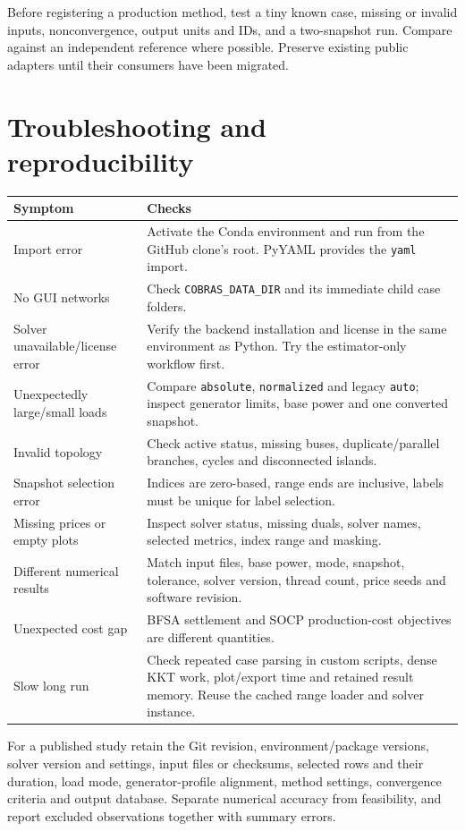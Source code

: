 \documentclass[11pt,a4paper]{article}
\newcommand{\code}[1]{\nolinkurl{#1}}
\begin{document}
Before registering a production method, test a tiny known case, missing or
invalid inputs, nonconvergence, output units and IDs, and a two-snapshot run.
Compare against an independent reference where possible. Preserve existing
public adapters until their consumers have been migrated.

\section{Troubleshooting and reproducibility}
\begin{longtable}{p{.32\linewidth}p{.60\linewidth}}
\toprule Symptom & Checks \\\midrule\endhead
Import error & Activate the Conda environment and run from the GitHub clone's root. PyYAML provides the \code{yaml} import.\\
No GUI networks & Check \code{COBRAS_DATA_DIR} and its immediate child case folders.\\
Solver unavailable/license error & Verify the backend installation and license in the same environment as Python. Try the estimator-only workflow first.\\
Unexpectedly large/small loads & Compare \code{absolute}, \code{normalized} and legacy \code{auto}; inspect generator limits, base power and one converted snapshot.\\
Invalid topology & Check active status, missing buses, duplicate/parallel branches, cycles and disconnected islands.\\
Snapshot selection error & Indices are zero-based, range ends are inclusive, labels must be unique for label selection.\\
Missing prices or empty plots & Inspect solver status, missing duals, solver names, selected metrics, index range and masking.\\
Different numerical results & Match input files, base power, mode, snapshot, tolerance, solver version, thread count, price seeds and software revision.\\
Unexpected cost gap & BFSA settlement and SOCP production-cost objectives are different quantities.\\
Slow long run & Check repeated case parsing in custom scripts, dense KKT work, plot/export time and retained result memory. Reuse the cached range loader and solver instance.\\
\bottomrule
\end{longtable}
For a published study retain the Git revision, environment/package versions,
solver version and settings, input files or checksums, selected rows and their
duration, load mode, generator-profile alignment, method settings, convergence
criteria and output database. Separate numerical accuracy from feasibility,
and report excluded observations together with summary errors.
\end{document}
